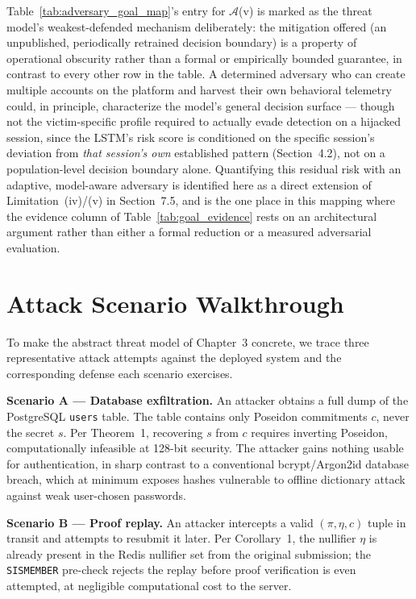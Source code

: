 \documentclass[12pt,a4paper,oneside]{report}
\begin{document}
Table~\ref{tab:adversary_goal_map}'s entry for $\mathcal{A}$(v) is
marked as the threat model's weakest-defended mechanism deliberately:
the mitigation offered (an unpublished, periodically retrained decision
boundary) is a property of operational obscurity rather than a formal
or empirically bounded guarantee, in contrast to every other row in the
table. A determined adversary who can create multiple accounts on the
platform and harvest their own behavioral telemetry could, in
principle, characterize the model's general decision surface --- though
not the victim-specific profile required to actually evade detection on
a hijacked session, since the LSTM's risk score is conditioned on the
specific session's deviation from \emph{that session's own} established
pattern (Section~4.2), not on a population-level decision boundary
alone. Quantifying this residual risk with an adaptive, model-aware
adversary is identified here as a direct extension of
Limitation~(iv)/(v) in Section~7.5, and is the one place in this
mapping where the evidence column of Table~\ref{tab:goal_evidence}
rests on an architectural argument rather than either a formal
reduction or a measured adversarial evaluation.

\section{Attack Scenario Walkthrough}

To make the abstract threat model of Chapter~3 concrete, we trace three
representative attack attempts against the deployed system and the
corresponding defense each scenario exercises.

\textbf{Scenario A --- Database exfiltration.} An attacker obtains a full
dump of the PostgreSQL \texttt{users} table. The table contains only
Poseidon commitments $c$, never the secret $s$. Per Theorem~1, recovering
$s$ from $c$ requires inverting Poseidon, computationally infeasible at
128-bit security. The attacker gains nothing usable for authentication,
in sharp contrast to a conventional bcrypt/Argon2id database breach,
which at minimum exposes hashes vulnerable to offline dictionary attack
against weak user-chosen passwords.

\textbf{Scenario B --- Proof replay.} An attacker intercepts a valid
$(\pi, \eta, c)$ tuple in transit and attempts to resubmit it later. Per
Corollary~1, the nullifier $\eta$ is already present in the Redis
nullifier set from the original submission; the \texttt{SISMEMBER}
pre-check rejects the replay before proof verification is even
attempted, at negligible computational cost to the server.
\end{document}
